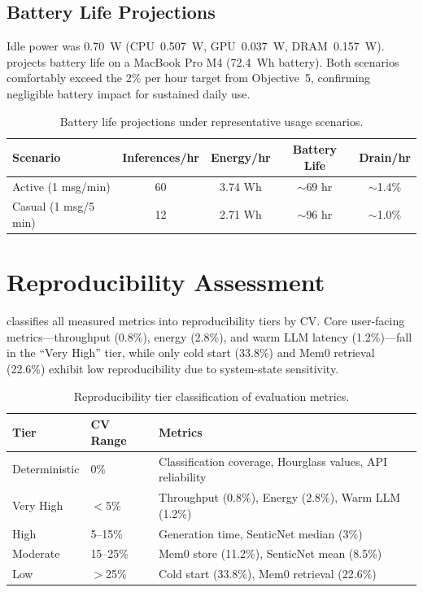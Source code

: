 \subsection{Battery Life Projections}
\label{subsec:battery-projections}

Idle power was 0.70~W (CPU~0.507~W, GPU~0.037~W, DRAM~0.157~W).  projects battery life on a MacBook Pro M4 (72.4~Wh battery). Both scenarios comfortably exceed the 2\% per hour target from Objective~5, confirming negligible battery impact for sustained daily use.

\begin{table}[htbp]
  \centering
  \caption{Battery life projections under representative usage scenarios.}
  \label{tab:battery-projections}
  \begin{tabular}{@{}lcccc@{}}
    \toprule
    \textbf{Scenario} & \textbf{Inferences/hr} & \textbf{Energy/hr} & \textbf{Battery Life} & \textbf{Drain/hr} \\
    \midrule
    Active (1 msg/min)   & 60 & 3.74 Wh & $\sim$69 hr & $\sim$1.4\% \\
    Casual (1 msg/5 min) & 12 & 2.71 Wh & $\sim$96 hr & $\sim$1.0\% \\
    \bottomrule
  \end{tabular}
\end{table}

\section{Reproducibility Assessment}
\label{sec:reproducibility}

 classifies all measured metrics into reproducibility tiers by CV. Core user-facing metrics---throughput (0.8\%), energy (2.8\%), and warm LLM latency (1.2\%)---fall in the ``Very High'' tier, while only cold start (33.8\%) and Mem0 retrieval (22.6\%) exhibit low reproducibility due to system-state sensitivity.

\begin{table}[htbp]
  \centering
  \caption{Reproducibility tier classification of evaluation metrics.}
  \label{tab:reproducibility-tiers}
  \begin{tabular}{@{}llp{7.5cm}@{}}
    \toprule
    \textbf{Tier} & \textbf{CV Range} & \textbf{Metrics} \\
    \midrule
    Deterministic & 0\%      & Classification coverage, Hourglass values, API reliability \\
    Very High     & $<$5\%   & Throughput (0.8\%), Energy (2.8\%), Warm LLM (1.2\%) \\
    High          & 5--15\%  & Generation time, SenticNet median (3\%) \\
    Moderate      & 15--25\% & Mem0 store (11.2\%), SenticNet mean (8.5\%) \\
    Low           & $>$25\%  & Cold start (33.8\%), Mem0 retrieval (22.6\%) \\
    \bottomrule
  \end{tabular}
\end{table}

